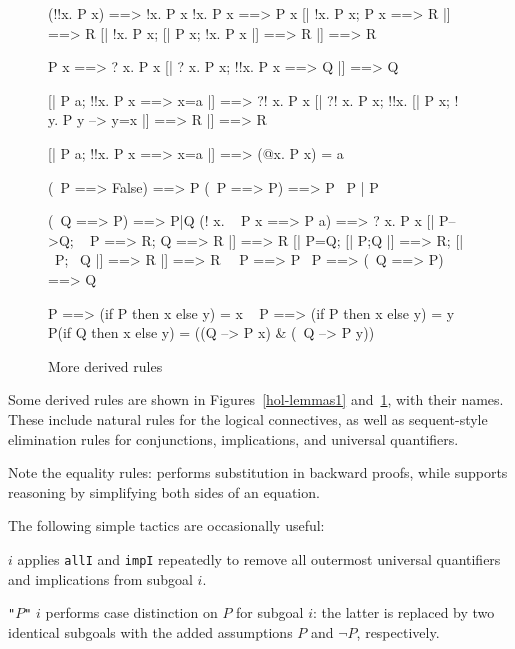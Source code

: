 \begin{figure}
\begin{ttbox}\makeatother
{}      (!!x. P x) ==> !x. P x
      !x. P x ==> P x
      [| !x. P x;  P x ==> R |] ==> R
  [| !x. P x;  [| P x; !x. P x |] ==> R |] ==> R

       P x ==> ? x. P x
       [| ? x. P x; !!x. P x ==> Q |] ==> Q

      [| P a;  !!x. P x ==> x=a |] ==> ?! x. P x
      [| ?! x. P x;  !!x. [| P x;  ! y. P y --> y=x |] ==> R 
          |] ==> R

 [| P a;  !!x. P x ==> x=a |] ==> (@x. P x) = a

          (~P ==> False) ==> P
       (~P ==> P) ==> P
 ~P | P

          (~Q ==> P) ==> P|Q
            (! x. ~ P x ==> P a) ==> ? x. P x
           [| P-->Q; ~ P ==> R; Q ==> R |] ==> R
           [| P=Q;  [| P;Q |] ==> R;  [| ~P; ~Q |] ==> R |] ==> R
         ~~P ==> P
            ~P ==> (~Q ==> P) ==> Q

            P ==> (if P then x else y) = x
        ~ P ==> (if P then x else y) = y
        P(if Q then x else y) = ((Q --> P x) & (~Q --> P y))
\end{ttbox}
\caption{More derived rules} \label{hol-lemmas2}
\end{figure}

Some derived rules are shown in Figures~\ref{hol-lemmas1}
and~\ref{hol-lemmas2}, with their {\ML} names.  These include natural rules
for the logical connectives, as well as sequent-style elimination rules for
conjunctions, implications, and universal quantifiers.  

Note the equality rules:  performs substitution in
backward proofs, while  supports reasoning by
simplifying both sides of an equation.

The following simple tactics are occasionally useful:
\begin{ttdescription}
\item[\ttindexbold{strip_tac} $i$] applies \texttt{allI} and \texttt{impI}
  repeatedly to remove all outermost universal quantifiers and implications
  from subgoal $i$.
\item[\ttindexbold{case_tac} {\tt"}$P${\tt"} $i$] performs case distinction
  on $P$ for subgoal $i$: the latter is replaced by two identical subgoals
  with the added assumptions $P$ and $\neg P$, respectively.
\end{ttdescription}


